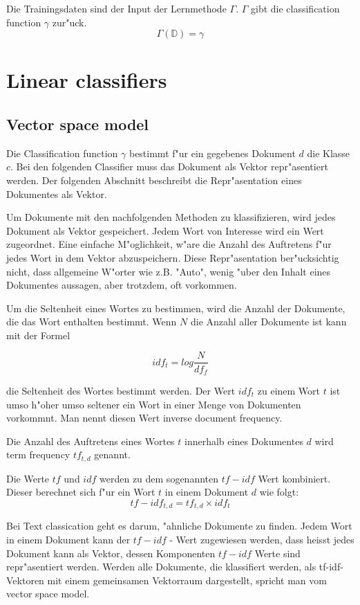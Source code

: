 \documentclass[12pt,a4paper,twoside]{article}
\begin{document}
Die Trainingsdaten sind der Input der Lernmethode $\Gamma$. $\Gamma$ gibt die classification function $\gamma$ zur"uck.
\[
\Gamma(\mathbb{D}) = \gamma
\]

\section{Linear classifiers}
\label{sec:linearclassifiers}

\subsection{Vector space model}
\label{sec:vectorspacemodel}
Die Classification function $\gamma$ bestimmt f"ur ein gegebenes Dokument $d$ die Klasse $c$. Bei den folgenden Classifier muss das Dokument als Vektor re\-pr"as\-entiert werden. Der folgenden Abschnitt beschreibt die Repr"asentation eines Dokumentes als Vektor.

Um Dokumente mit den nachfolgenden Methoden zu klassifizieren, wird jedes Dokument als Vektor gespeichert. Jedem Wort von Interesse wird ein Wert zugeordnet. Eine einfache M"oglichkeit, w"are die Anzahl des Auftretens f"ur jedes Wort in dem Vektor abzuspeichern. Diese Repr"asentation ber"ucksichtig nicht, dass allgemeine W"orter wie z.B. "Auto", wenig "uber den Inhalt eines Dokumentes aussagen, aber trotzdem, oft vorkommen.

Um die Seltenheit eines Wortes zu bestimmen, wird die Anzahl der Dokumente, die das Wort enthalten bestimmt. Wenn $N$ die Anzahl aller Dokumente ist kann mit der Formel

\[
idf_t = log \frac{ N}{df_f}
\]

die Seltenheit des Wortes bestimmt werden. Der Wert $idf_t$ zu einem Wort $t$ ist umso h"oher umso seltener ein Wort in einer Menge von Dokumenten vorkommnt. Man nennt diesen Wert inverse document frequency.

Die Anzahl des Auftretens eines Wortes $t$ innerhalb eines Dokumentes $d$ wird term frequency $tf_{t,d}$ genannt.

Die Werte $tf$ und $idf$ werden zu dem sogenannten $tf-idf$ Wert kombiniert. Dieser berechnet sich f"ur ein Wort $t$ in einem Dokument $d$ wie folgt:
\[
tf-idf_{t,d} = tf_{t,d} \times idf_t
\]

Bei Text classication geht es darum, "ahnliche Dokumente zu finden. Jedem Wort in einem Dokument kann der $tf-idf$ - Wert zugewiesen werden, dass heisst jedes Dokument kann als Vektor, dessen Komponenten $tf-idf$ Werte sind repr"asentiert werden. Werden alle Dokumente, die klassifiert werden, als tf-idf-Vektoren mit einem gemeinsamen Vektorraum dargestellt, spricht man vom vector space model.
\end{document}
